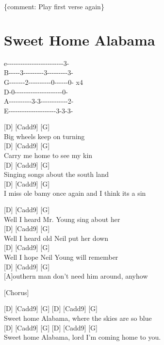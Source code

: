 \documentclass[
  letterpaper,
]{scrbook}
\begin{document}
\{comment: Play first verse again\}

\hypertarget{sweet-home-alabama}{%
\chapter{Sweet Home Alabama}\label{sweet-home-alabama}}

e\textbar-\/-\/-\/-\/-\/-\/-\/-\/-\/-\/-\/-\/-\/-\/-\/-\/-\/-\/-\/-\/-\/-\/-\/-\/-3-\textbar{}\\
B\textbar-\/-\/-\/-\/-3-\/-\/-\/-\/-\/-\/-\/-\/-3-\/-\/-\/-\/-\/-\/-\/-\/-3-\textbar{}\\
G\textbar-\/-\/-\/-\/-\/-\/-2-\/-\/-\/-\/-\/-\/-\/-\/-\/-0-\/-\/-\/-\/-\/-0-\textbar{}
x4\\
D-0-\/-\/-\/-\/-\/-\/-\/-\/-\/-\/-\/-\/-\/-\/-\/-\/-\/-\/-\/-\/-0-\textbar{}\\
A\textbar-\/-\/-\/-\/-\/-\/-\/-\/-\/-3-3-\/-\/-\/-\/-\/-\/-\/-\/-\/-\/-\/-2-\textbar{}\\
E\textbar-\/-\/-\/-\/-\/-\/-\/-\/-\/-\/-\/-\/-\/-\/-\/-\/-\/-\/-\/-\/-3-3-3-\textbar{}

{[}D{]} {[}Cadd9{]} {[}G{]}\\
Big wheels keep on turning\\
{[}D{]} {[}Cadd9{]} {[}G{]}\\
Carry me home to see my kin\\
{[}D{]} {[}Cadd9{]} {[}G{]}\\
Singing songs about the south land\\
{[}D{]} {[}Cadd9{]} {[}G{]}\\
I miss \textquotesingle ole\textquotesingle{} \textquotesingle bamy once
again and I think it\textquotesingle s a sin

{[}D{]} {[}Cadd9{]} {[}G{]}\\
Well I heard Mr. Young sing about her\\
{[}D{]} {[}Cadd9{]} {[}G{]}\\
Well I heard old Neil put her down\\
{[}D{]} {[}Cadd9{]} {[}G{]}\\
Well I hope Neil Young will remember\\
{[}D{]} {[}Cadd9{]} {[}G{]}\\
{[}A{]}outhern man don't need him around, anyhow

{[}Chorus{]}

{[}D{]} {[}Cadd9{]} {[}G{]} {[}D{]} {[}Cadd9{]} {[}G{]}\\
Sweet home Alabama, where the skies are so blue\\
{[}D{]} {[}Cadd9{]} {[}G{]} {[}D{]} {[}Cadd9{]} {[}G{]}\\
Sweet home Alabama, lord I'm coming home to you.
\end{document}
